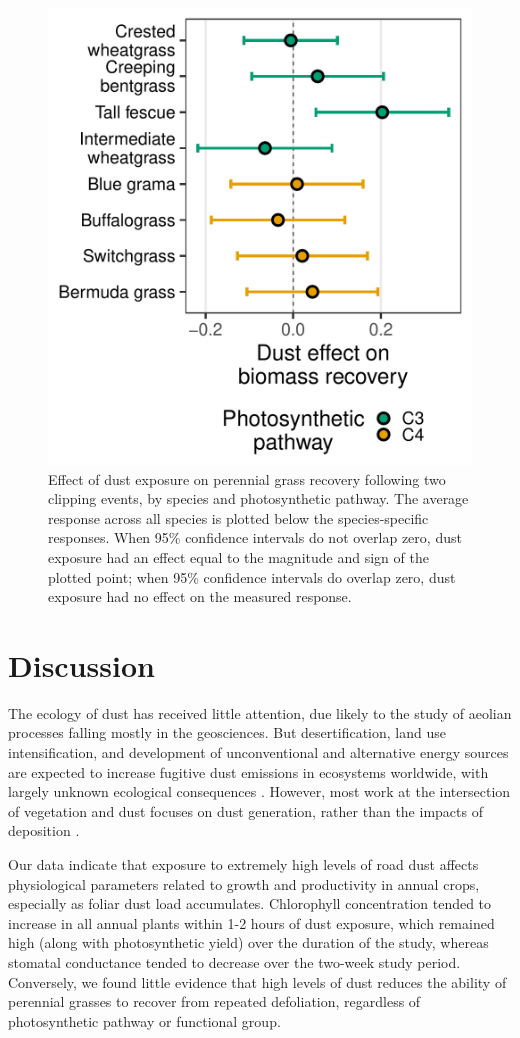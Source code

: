 \documentclass{svjour3}
\begin{document}
 

\begin{figure}
	\centering
	\includegraphics[width=0.6\linewidth]{figures/GrassCIs-1}
	\caption{Effect of dust exposure on perennial grass recovery following two clipping events, by species and photosynthetic pathway. 
		The average response across all species is plotted below the species-specific responses.
		When 95\% confidence intervals do not overlap zero, dust exposure had an effect equal to the magnitude and sign of the plotted point; when 95\% confidence intervals do overlap zero, dust exposure had no effect on the measured response. \label{fig:grassCIs} }
\end{figure}


\clearpage 

\section{Discussion} 

The ecology of dust has received little attention, due likely to the study of aeolian processes falling mostly in the geosciences. 
But desertification, land use intensification, and development of unconventional and alternative energy sources are expected to increase fugitive dust emissions in ecosystems worldwide, with largely unknown ecological consequences \citep{field2010}.  
However, most work at the intersection of vegetation and dust focuses on dust generation, rather than the impacts of deposition \citep[e.g.,][]{belnap2014, flagg2014,nandintsetseg2015}. 

Our data indicate that exposure to extremely high levels of road dust affects physiological parameters related to growth and productivity in annual crops, especially as foliar dust load accumulates. 
Chlorophyll concentration tended to increase in all annual plants within 1-2 hours of dust exposure, which remained high (along with photosynthetic yield) over the duration of the study, whereas stomatal conductance tended to decrease over the two-week study period.
Conversely, we found little evidence that high levels of dust reduces the ability of perennial grasses to recover from repeated defoliation, regardless of photosynthetic pathway or functional group. 
\end{document}
